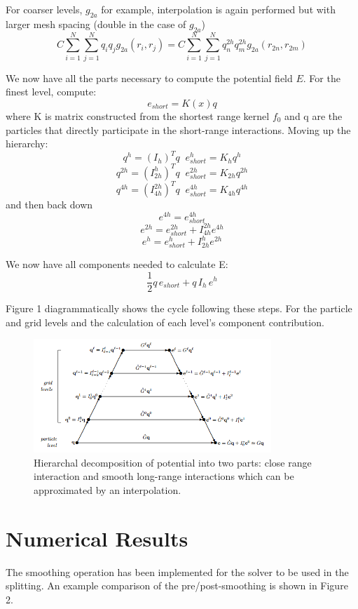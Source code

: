 \documentclass[review]{siamart}
\newcommand{\be}{\begin{equation}}
\newcommand{\ee}{\end{equation}}
\begin{document}
For coarser levels, $g_{2a}$ for example, interpolation is again performed but with larger mesh spacing (double in the case of $g_{2a}$)
\be C \sum_{i=1}^N \sum_{j=1}^N q_i q_j g_{2a}(r_i,r_j)  = C \sum_{i=1}^N \sum_{j=1}^N q_n^{2h} q_m^{2h} g_{2a}(r_{2n},r_{2m}) \ee

We now have all the parts necessary to compute the potential field $E$. For the finest level, compute:
\be e_{short} =K(x)q \ee
where K is matrix constructed from the shortest range kernel $f_0$ and q are the particles that directly participate in the short-range interactions. Moving up the hierarchy:
\be q^h = (I_h)^T q \;\; e^h_{short} = K_hq^h \ee
\be q^{2h} = (I_{2h}^h)^T q \;\; e^{2h}_{short} = K_{2h}q^{2h} \ee
\be q^{4h} = (I_{4h}^{2h})^T q \;\; e^{4h}_{short} = K_{4h}q^{4h} \ee
and then back down
\be e^{4h} = e^{4h}_{short} \ee
\be e^{2h} = e^{2h}_{short} + I^{2h}_{4h}e^{4h} \ee
\be e^{h} = e^{h}_{short}+I^h_{2h}e^{2h} \ee

We now have all components needed to calculate E:
\be \frac{1}{2}q\, e_{short} + q \, I_h \, e^h \ee

Figure 1 diagrammatically shows the cycle following these steps. For the particle and grid levels and the calculation of each level's component contribution.

\begin{figure}[!htb]
\centering
\includegraphics[width=0.8\textwidth]{levels.PNG}
\caption{Hierarchal decomposition of potential into two parts: close range interaction and smooth long-range interactions which can be approximated by an interpolation.\cite{3}}
\end{figure}

\section{Numerical Results}\label{sec:num}
The smoothing operation has been implemented for the solver to be used in the splitting. An example comparison of the pre/post-smoothing is shown in Figure 2.
\end{document}
